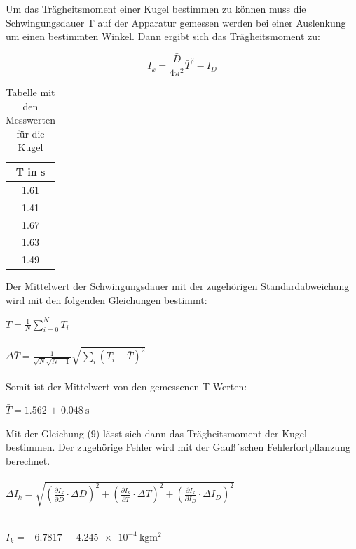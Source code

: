 Um das Trägheitsmoment einer Kugel bestimmen zu können muss die Schwingungsdauer T
auf der Apparatur gemessen werden bei einer Auslenkung um einen bestimmten Winkel.
Dann ergibt sich das Trägheitsmoment zu:

\begin{equation}
  I_k = \frac{\bar{D}}{4\pi^2}\bar{T}^2 - I_D
\end{equation}

\begin{table}[H]
  \centering
  \caption{Tabelle mit den Messwerten für die Kugel}
  \begin{tabular}{c}
    \toprule
    T in \si{\second} \\
    \midrule
    1.61 \\
    1.41 \\
    1.67 \\
    1.63 \\
    1.49 \\
    \bottomrule
  \end{tabular}
\end{table}

Der Mittelwert der Schwingungsdauer mit der zugehörigen Standardabweichung
 wird mit den folgenden Gleichungen bestimmt:

$\bar{T} = \frac{1}{N} \sum_{i=0}^{N} T_i$\\\\

$\Delta \bar{T} = \frac{1}{\sqrt{N}\sqrt{N-1}} \sqrt{\sum_{i}(T_i-\bar{T})^2}$\\\\

 Somit ist der Mittelwert von den gemessenen T-Werten:

 \centerline{$\bar{T} = \SI{1.562(48)}{\second}$}

 Mit der Gleichung (9) lässt sich dann das Trägheitsmoment der Kugel bestimmen. Der
 zugehörige Fehler wird mit der Gauß´schen Fehlerfortpflanzung berechnet.\\\\

 $\Delta I_k = \sqrt{\left(\frac{\partial I_k}{\partial \bar{D}} \cdot \Delta \bar{D} \right)^2
  + \left(\frac{\partial I_k}{\partial \bar{T}} \cdot \Delta \bar{T} \right)^2
   + \left(\frac{\partial I_k}{\partial I_D} \cdot \Delta I_D \right)^2}$\\\\

\centerline{$I_k = \SI{-6.7817(42450)e-4}{\kilo\gram\meter\squared}$}

